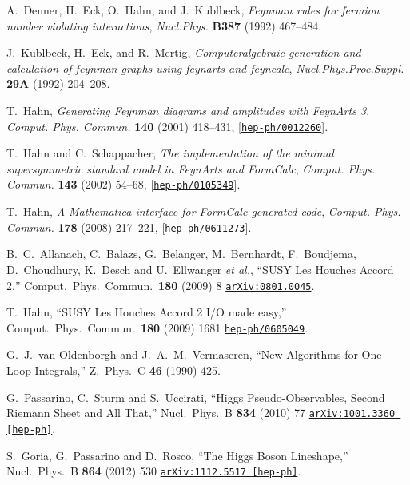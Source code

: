 \documentclass[english,12pt]{article}
\begin{document}
\begin{thebibliography}{10}
A.~Denner, H.~Eck, O.~Hahn, and J.~Kublbeck, {\it {Feynman rules for fermion
  number violating interactions}},  {\em Nucl.Phys.} {\bf B387} (1992)
  467--484.

J.~Kublbeck, H.~Eck, and R.~Mertig, {\it Computeralgebraic generation and
  calculation of feynman graphs using feynarts and feyncalc},  {\em
  Nucl.Phys.Proc.Suppl.} {\bf 29A} (1992) 204--208.

T.~Hahn, {\it {Generating Feynman diagrams and amplitudes with FeynArts 3}},
  {\em Comput. Phys. Commun.} {\bf 140} (2001) 418--431,
  [\href{https://www.arXiv.org/abs/hep-ph/0012260}{{\tt hep-ph/0012260}}].

T.~Hahn and C.~Schappacher, {\it {The implementation of the minimal
  supersymmetric standard model in FeynArts and FormCalc}},  {\em Comput. Phys.
  Commun.} {\bf 143} (2002) 54--68,
  [\href{https://www.arXiv.org/abs/hep-ph/0105349}{{\tt hep-ph/0105349}}].

T.~Hahn, {\it {A Mathematica interface for FormCalc-generated code}},  {\em
  Comput. Phys. Commun.} {\bf 178} (2008) 217--221,
  [\href{https://www.arXiv.org/abs/hep-ph/0611273}{{\tt hep-ph/0611273}}].

  B.~C.~Allanach, C.~Balazs, G.~Belanger, M.~Bernhardt, F.~Boudjema, D.~Choudhury, K.~Desch and U.~Ellwanger {\it et al.},
  ``SUSY Les Houches Accord 2,''
  Comput.\ Phys.\ Commun.\  {\bf 180} (2009) 8
  \href{https://arxiv.org/abs/0801.0045}{\tt arXiv:0801.0045}.

  T.~Hahn,
  ``SUSY Les Houches Accord 2 I/O made easy,''
  Comput.\ Phys.\ Commun.\  {\bf 180} (2009) 1681
  \href{https://arxiv.org/abs/hep-ph/0605049}{\tt hep-ph/0605049}.

  G.~J.~van Oldenborgh and J.~A.~M.~Vermaseren,
  ``New Algorithms for One Loop Integrals,''
  Z.\ Phys.\ C {\bf 46} (1990) 425.

  G.~Passarino, C.~Sturm and S.~Uccirati,
  ``Higgs Pseudo-Observables, Second Riemann Sheet and All That,''
  Nucl.\ Phys.\ B {\bf 834} (2010) 77
  \href{https://arxiv.org/abs/1001.3360}{\tt arXiv:1001.3360 [hep-ph]}.

  S.~Goria, G.~Passarino and D.~Rosco,
  ``The Higgs Boson Lineshape,''
  Nucl.\ Phys.\ B {\bf 864} (2012) 530
  \href{https://arxiv.org/abs/1112.5517}{\tt arXiv:1112.5517 [hep-ph]}.


\end{thebibliography}
\end{document}
